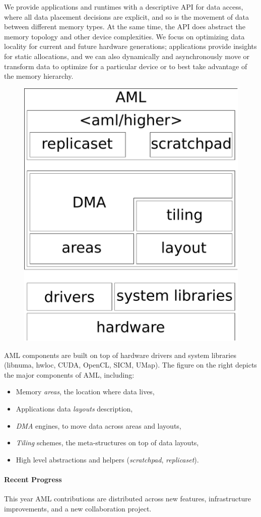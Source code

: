 We provide applications and runtimes with a descriptive API for data
access, where all data placement decisions are explicit, and so is the
movement of data between different memory types.  At the same time, the API
does abstract the memory topology and other device complexities.  We focus
on optimizing data locality for current and future hardware generations;
applications provide insights for static allocations, and we can also
dynamically and asynchronously move or transform data to optimize for a particular 
device or to best take advantage of the memory hierarchy.

\begin{figure}
\includegraphics[width=.18\textwidth]{projects/2.3.1-PMR/2.3.1.19-Argo-PowerSteering/aml-components}
\end{figure}
AML components are built on top of hardware drivers and system
libraries (libnuma, hwloc, CUDA, OpenCL, SICM, UMap).
The figure on the right depicts the major components of AML, including:
\begin{itemize}
\item Memory \emph{areas}, the location where data lives,
\item Applications data \emph{layouts} description,
\item \emph{DMA} engines, to move data across areas and layouts,
\item \emph{Tiling} schemes, the meta-structures on top of data layouts,
\item High level abstractions and helpers (\emph{scratchpad}, \emph{replicaset}).
\end{itemize}

\paragraph{Recent Progress}

This year AML contributions are distributed across new features,
infrastructure improvements, and a new collaboration project.

